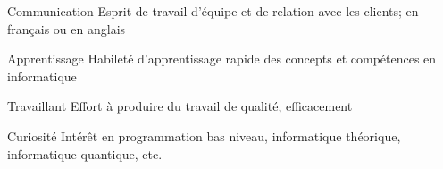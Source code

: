 

\begin{cvskills}

  \cvskill
    {Communication} %
    {Esprit de travail d'équipe et de relation avec les clients; en français ou en anglais}
    
  \cvskill
    {Apprentissage} %
    {Habileté d'apprentissage rapide des concepts et compétences en informatique}
    
  \cvskill
    {Travaillant} %
    {Effort à produire du travail de qualité, efficacement}
    
  \cvskill
    {Curiosité} %
    {Intérêt en programmation bas niveau, informatique théorique, informatique quantique, etc.}

\end{cvskills}
